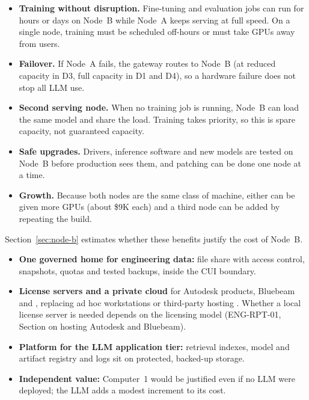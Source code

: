 \begin{itemize}
  \item \textbf{Training without disruption.} Fine-tuning and evaluation jobs can run for
    hours or days on Node~B while Node~A keeps serving at full speed. On a single node,
    training must be scheduled off-hours or must take GPUs away from users.
  \item \textbf{Failover.} If Node~A fails, the gateway routes to Node~B (at reduced
    capacity in D3, full capacity in D1 and D4), so a hardware failure does not stop all
    LLM use.
  \item \textbf{Second serving node.} When no training job is running, Node~B can load the
    same model and share the load. Training takes priority, so this is spare capacity, not
    guaranteed capacity.
  \item \textbf{Safe upgrades.} Drivers, inference software and new models are tested on
    Node~B before production sees them, and patching can be done one node at a time.
  \item \textbf{Growth.} Because both nodes are the same class of machine, either can be
    given more GPUs (about \$9K each) and a third node can be added by repeating the build.
\end{itemize}
Section~\ref{sec:node-b} estimates whether these benefits justify the cost of Node~B.

\begin{itemize}
  \item \textbf{One governed home for engineering data:} file share with access
    control, snapshots, quotas and tested backups, inside the CUI boundary.
  \item \textbf{License servers and a private cloud} for Autodesk products, Bluebeam and
    , replacing ad hoc workstations or third-party hosting
    . Whether a local license server is needed
    depends on the licensing model (ENG-RPT-01, Section on hosting Autodesk and Bluebeam).
  \item \textbf{Platform for the LLM application tier:} retrieval indexes, model and
    artifact registry and logs sit on protected, backed-up storage.
  \item \textbf{Independent value:} Computer~1 would be justified even if no LLM were
    deployed; the LLM adds a modest increment to its cost.
\end{itemize}

